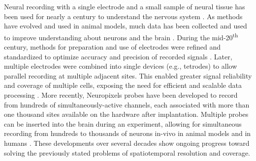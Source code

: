 \documentclass[11pt]{article}
\begin{document}
Neural recording with a single electrode and a small sample of neural tissue has been used for nearly a century to understand the nervous system \cite{piccolino1997galvani, adrian1928basis}. As methods have evolved and used in animal models, much data has been collected and used to improve understanding about neurons and the brain \cite{ibl2022datarelease, wilson1993ensemble}. During the mid-20\textsuperscript{th} century, methods for preparation and use of electrodes were refined and standardized to optimize accuracy and precision of recorded signals \cite{dowben1953electrode, green1958microelectrode}. Later, multiple electrodes were combined into single devices (e.g., tetrodes) to allow parallel recording at multiple adjacent sites. This enabled greater signal reliability and coverage of multiple cells, exposing the need for efficient and scalable data processing \cite{mcnaughton1983tetrode, wilson1993ensemble, jog2002tetrode}. More recently, Neuropixels probes have been developed to record from hundreds of simultaneously-active channels, each associated with more than one thousand sites available on the hardware after implantation. Multiple probes can be inserted into the brain during an experiment, allowing for simultaneous recording from hundreds to thousands of neurons in-vivo in animal models and in humans \cite{jun2017probes, steinmetz2021probes, paulk2022probes, ibl2022datarelease}. These developments over several decades show ongoing progress toward solving the previously stated problems of spatiotemporal resolution and coverage.
\end{document}
